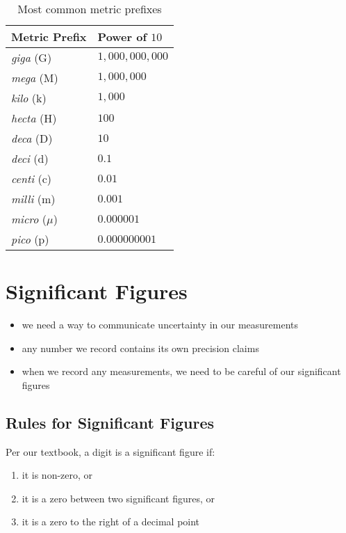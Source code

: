 \documentclass[11pt, oneside]{article}   	%
\begin{document}
\begin{table}
\centering
\begin{tabular}[b]{l|l}
\hline
Metric Prefix & Power of $10$ \\
\hline
\emph{giga} (G)           & $ 1,000,000,000 $   \\
\emph{mega} (M)         & $ 1,000,000 $   \\
\emph{kilo} (k)              & $ 1,000 $   \\
\emph{hecta} (H)          & $ 100 $   \\
\emph{deca} (D)           & $ 10 $   \\
\emph{deci} (d)             & $ 0.1 $   \\
\emph{centi} (c)            & $ 0.01 $   \\
\emph{milli}  (m)           & $ 0.001 $  \\
\emph{micro} ($\mu$)  & $ 0.000001 $  \\
\emph{pico}  (p)           & $ 0.000000001 $  \\
\end{tabular}
\caption{Most common metric prefixes}
\label{table:mprefixes}
\end{table}


\section{Significant Figures}
\begin{itemize}
\item we need a way to communicate uncertainty in our measurements
\item any number we record contains its own precision claims
\item when we record any measurements, we need to be careful of our significant figures
\end{itemize}

\subsection{Rules for Significant Figures}
Per our textbook\cite[p. 21]{wile-chem-2}, a digit is a significant figure if:
\begin{enumerate}
\item it is non-zero, or
\item it is a zero between two significant figures, or
\item it is a zero to the right of a decimal point
\end{enumerate}
\end{document}
